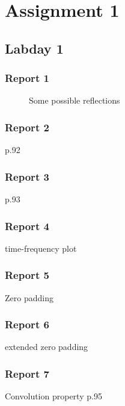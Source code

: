 \documentclass[11pt,titlepage]{report}
\begin{document}
\chapter{Assignment 1}
\section{Labday 1}
\subsection{Report 1}
\begin{figure}[H]
	\centering
	
	\caption{Some possible reflections}
	\label{fig:reflections}
\end{figure}

\subsection{Report 2}
p.92
\subsection{Report 3}
p.93
\subsection{Report 4}
time-frequency plot
\subsection{Report 5}
Zero padding
\subsection{Report 6}
extended zero padding
\subsection{Report 7}
Convolution property p.95
\end{document}
